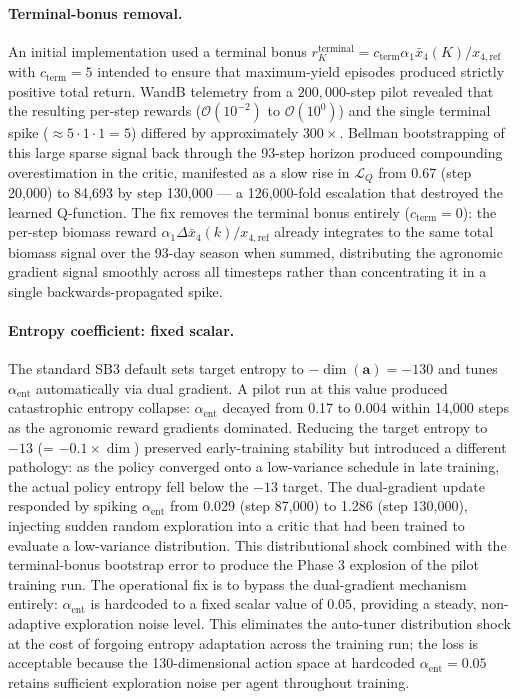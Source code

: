 \paragraph{Terminal-bonus removal.}
An initial implementation used a terminal bonus
$r_K^{\mathrm{terminal}} = c_{\mathrm{term}} \alpha_1 \bar{x}_4(K)/x_{4,\mathrm{ref}}$
with $c_{\mathrm{term}} = 5$ intended to ensure that maximum-yield episodes
produced strictly positive total return. WandB telemetry from a
$200{,}000$-step pilot revealed that the resulting per-step rewards
($\mathcal{O}(10^{-2})$ to $\mathcal{O}(10^0)$) and the single terminal
spike ($\approx 5 \cdot 1 \cdot 1 = 5$) differed by approximately
$300\times$. Bellman bootstrapping of this large sparse signal back through
the 93-step horizon produced compounding overestimation in the critic,
manifested as a slow rise in $\mathcal{L}_Q$ from 0.67 (step 20{,}000) to
84{,}693 by step 130{,}000 — a 126{,}000-fold escalation that destroyed the
learned Q-function. The fix removes the terminal bonus entirely
($c_{\mathrm{term}} = 0$): the per-step biomass reward
$\alpha_1 \Delta \bar{x}_4(k)/x_{4,\mathrm{ref}}$ already integrates to the
same total biomass signal over the 93-day season when summed, distributing
the agronomic gradient signal smoothly across all timesteps rather than
concentrating it in a single backwards-propagated spike.

\paragraph{Entropy coefficient: fixed scalar.}
The standard SB3 default sets target entropy to $-\dim(\mathbf{a}) = -130$
and tunes $\alpha_{\mathrm{ent}}$ automatically via dual gradient. A pilot
run at this value produced catastrophic entropy collapse: $\alpha_{\mathrm{ent}}$
decayed from 0.17 to 0.004 within 14{,}000 steps as the agronomic reward
gradients dominated. Reducing the target entropy to $-13$ (= $-0.1 \times \dim$)
preserved early-training stability but introduced a different pathology: as
the policy converged onto a low-variance schedule in late training, the
actual policy entropy fell below the $-13$ target. The dual-gradient update
responded by spiking $\alpha_{\mathrm{ent}}$ from 0.029 (step 87{,}000) to
1.286 (step 130{,}000), injecting sudden random exploration into a critic
that had been trained to evaluate a low-variance distribution. This
distributional shock combined with the terminal-bonus bootstrap error to
produce the Phase 3 explosion of the pilot training run. The operational
fix is to bypass the dual-gradient mechanism entirely: $\alpha_{\mathrm{ent}}$
is hardcoded to a fixed scalar value of $0.05$, providing a steady,
non-adaptive exploration noise level. This eliminates the auto-tuner
distribution shock at the cost of forgoing entropy adaptation across the
training run; the loss is acceptable because the 130-dimensional action
space at hardcoded $\alpha_{\mathrm{ent}} = 0.05$ retains sufficient
exploration noise per agent throughout training.

